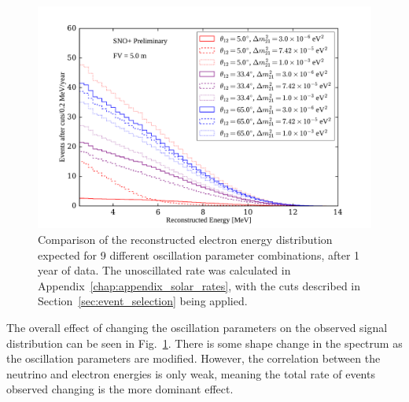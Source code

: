 \begin{figure}[!th]
    \centering
    \includegraphics[width=\textwidth]{6_SolarAnalysis/images/rec_energy_dist_vs_osc_params2.pdf}
    \caption[Comparison of the reconstructed electron energy distribution expected for 9 different oscillation parameter combinations]
    {Comparison of the reconstructed electron energy distribution expected for 9 different oscillation parameter combinations, after 1 year of data. The unoscillated rate was calculated in Appendix~\ref{chap:appendix_solar_rates}, with the cuts described in Section~\ref{sec:event_selection} being applied.}
    \label{fig:rec_energy_dist_vs_osc_params}
\end{figure}

The overall effect of changing the oscillation parameters on the observed signal distribution can be seen in Fig.~\ref{fig:rec_energy_dist_vs_osc_params}. There is some shape change in the spectrum as the oscillation parameters are modified. However, the correlation between the neutrino and electron energies is only weak, meaning the total rate of \beight{} events observed changing is the more dominant effect.


